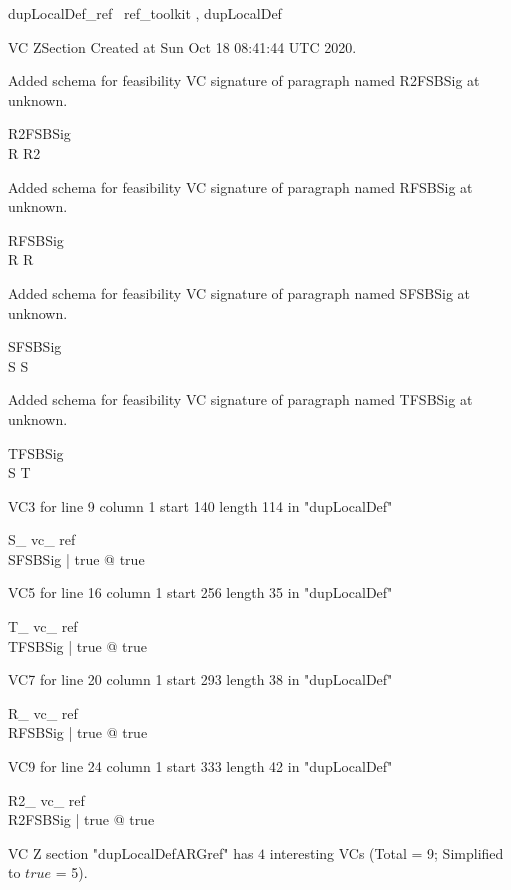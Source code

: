 \documentclass{article}
\begin{document}

\begin{zsection}	 \SECTION dupLocalDef\_ref \parents~ref\_toolkit , dupLocalDef
\end{zsection}

VC ZSection Created at Sun Oct 18 08:41:44 UTC 2020.


Added schema for feasibility VC signature of paragraph named R2FSBSig at unknown.
\begin{schema}{R2FSBSig}
\\
 R 
\where
 R2
\end{schema}


Added schema for feasibility VC signature of paragraph named RFSBSig at unknown.
\begin{schema}{RFSBSig}
\\
 R 
\where
 R
\end{schema}


Added schema for feasibility VC signature of paragraph named SFSBSig at unknown.
\begin{schema}{SFSBSig}
\\
 S 
\where
 S
\end{schema}


Added schema for feasibility VC signature of paragraph named TFSBSig at unknown.
\begin{schema}{TFSBSig}
\\
 S 
\where
 T
\end{schema}

VC3 for line 9 column 1 start 140 length 114 in "dupLocalDef"
\begin{theorem}{ S\_ vc\_ ref}\\
 \exists SFSBSig | true @ true \\

\end{theorem}

VC5 for line 16 column 1 start 256 length 35 in "dupLocalDef"
\begin{theorem}{ T\_ vc\_ ref}\\
 \exists TFSBSig | true @ true \\

\end{theorem}

VC7 for line 20 column 1 start 293 length 38 in "dupLocalDef"
\begin{theorem}{ R\_ vc\_ ref}\\
 \exists RFSBSig | true @ true \\

\end{theorem}

VC9 for line 24 column 1 start 333 length 42 in "dupLocalDef"
\begin{theorem}{ R2\_ vc\_ ref}\\
 \exists R2FSBSig | true @ true \\

\end{theorem}



 VC Z section "dupLocalDefARGref" has $4$ interesting VCs (Total = 9; Simplified to $true$ = 5).



\end{document}
